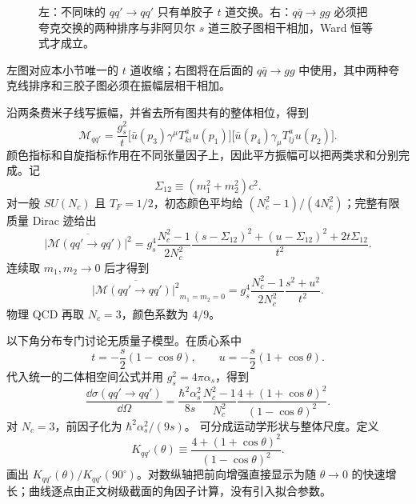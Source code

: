 \begin{figure}[htbp]
 \centering
 
 \caption{左：不同味的 $qq'\to qq'$ 只有单胶子 $t$ 道交换。右：$q\bar q\to gg$ 必须把夸克交换的两种排序与非阿贝尔 $s$ 道三胶子图相干相加，Ward 恒等式才成立。}
 \label{fig:qcd-tree-processes-dp10}
\end{figure}

 左图对应本小节唯一的 $t$ 道收缩；右图将在后面的 $q\bar q\to gg$ 中使用，其中两种夸克线排序和三胶子图必须在振幅层相干相加。

沿两条费米子线写振幅，并省去所有图共有的整体相位，得到
\begin{equation}
 {
 \mathcal M_{qq'}
 =\frac{g_s^2}{t}
 \bigl[\bar u(p_3)\gamma^\mu T^a_{ki}u(p_1)\bigr]
 \bigl[\bar u(p_4)\gamma_\mu T^a_{lj}u(p_2)\bigr].}
 \label{eq:qqprime-amplitude-dp10}
\end{equation}
颜色指标和自旋指标作用在不同张量因子上，因此平方振幅可以把两类求和分别完成。记
\begin{equation*}
 \Sigma_{12}\equiv(m_1^2+m_2^2)c^2 .
\end{equation*}
对一般 $SU(N_c)$ 且 $T_F=1/2$，初态颜色平均给 $(N_c^2-1)/(4N_c^2)$；完整有限质量 Dirac 迹给出
\begin{equation}
 {
 \overline{|\mathcal M(qq'\to qq')|^2}
 =g_s^4\frac{N_c^2-1}{2N_c^2}
 \frac{(s-\Sigma_{12})^2+(u-\Sigma_{12})^2+2t\Sigma_{12}}{t^2}.}
 \label{eq:qqprime-M2-massive-dp115}
\end{equation}
连续取 $m_1,m_2\to0$ 后才得到
\begin{equation}
 {
 \overline{|\mathcal M(qq'\to qq')|^2}_{m_1=m_2=0}
 =g_s^4\frac{N_c^2-1}{2N_c^2}
 \frac{s^2+u^2}{t^2}.}
 \label{eq:qqprime-M2-final-dp10}
\end{equation}
物理 QCD 再取 $N_c=3$，颜色系数为 $4/9$。

以下角分布专门讨论无质量子模型。在质心系中
\begin{equation*}
 t=-\frac s2(1-\cos\theta),
 \qquad
 u=-\frac s2(1+\cos\theta).
\end{equation*}
代入统一的二体相空间公式并用 $g_s^2=4\pi\alpha_s$，得到
\begin{equation}
 {
 \frac{\dd\sigma(qq'\to qq')}{\dd\Omega}
 =\frac{\hbar^2\alpha_s^2}{8s}
 \frac{N_c^2-1}{N_c^2}
 \frac{4+(1+\cos\theta)^2}{(1-\cos\theta)^2}.}
 \label{eq:qqprime-angular-cross-section-dp10}
\end{equation}
对 $N_c=3$，前因子化为 $\hbar^2\alpha_s^2/(9s)$。 可分成运动学形状与整体尺度。定义
\begin{equation}
 K_{qq'}(\theta)
 \equiv
 \frac{4+(1+\cos\theta)^2}{(1-\cos\theta)^2}.
 \label{eq:qcd-qqprime-angular-kernel-dp68}
\end{equation}
 画出 $K_{qq'}(\theta)/K_{qq'}(90^\circ)$。对数纵轴把前向增强直接显示为随 $\theta\to0$ 的快速增长；曲线逐点由正文树级截面的角因子计算，没有引入拟合参数。

